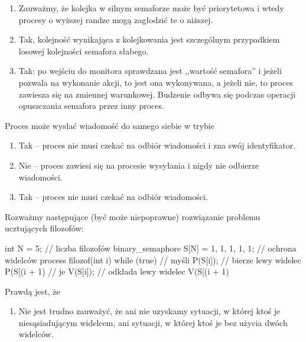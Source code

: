 \begin{solutions}
    \begin{enumerate}[\bf A.]
        \item Zauważmy, że kolejka w silnym semaforze może być priorytetowa i wtedy procesy o wyższej randze mogą zagłodzić te o niższej.
        \item Tak, kolejność wynikająca z kolejkowania jest szczególnym przypadkiem losowej kolejności semafora słabego.
        \item Tak: po wejściu do monitora sprawdzana jest ,,wartość semafora'' i jeżeli pozwala na wykonanie akcji, to jest ona wykonywana, a jeżeli nie, to proces zawiesza się na zmiennej warunkowej. Budzenie odbywa się podczas operacji opuszczania semafora przez inny proces.
    \end{enumerate}

    \sol Proces może wysłać wiadomość do samego siebie w trybie

    \begin{enumerate}[\bf A.]
        \item Tak -- proces nie musi czekać na odbiór wiadomości i zna swój identyfikator.
        \item Nie -- proces zawiesi się na procesie wysyłania i nigdy nie odbierze wiadomości. 
        \item Tak -- proces nie musi czekać na odbiór wiadomości.
    \end{enumerate}

    \sol Rozważmy następujące (być może niepoprawne) rozwiązanie problemu ucztujących filozofów:
    \begin{java}
        int N = 5; // liczba filozofów
        binary_semaphore S[N] = {1, 1, 1, 1, 1}; // ochrona widelców
        process filozof(int i) {
            while (true) {
                // myśli
                P(S[i]); // bierze lewy widelec
                P(S[(i + 1) %
                // je
                V(S[i]); // odkłada lewy widelec
                V(S[(i + 1) %
            }
        }
    \end{java}
    Prawdą jest, że

    \begin{enumerate}[\bf A.]
        \item Nie jest trudno zauważyć, że ani nie uzyskamy sytuacji, w której ktoś je niesąsiadującym widelcem, ani sytuacji, w której ktoś je bez użycia dwóch widelców.


\end{enumerate}
\end{solutions}
